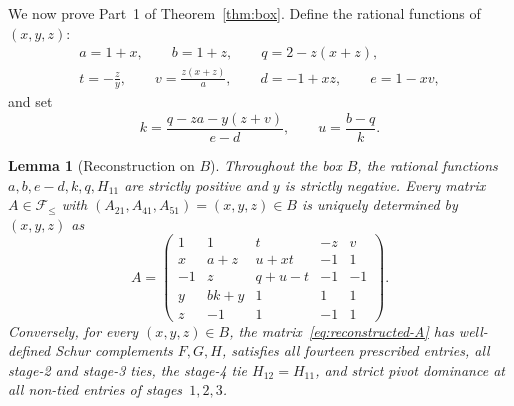 \documentclass[11pt]{article}
\newtheorem{lemma}[theorem]{Lemma}
\theoremstyle{remark}
\begin{document}
We now prove Part~1 of Theorem~\ref{thm:box}. Define the rational functions of
$(x,y,z)$:
\begin{equation}\label{eq:aux-vars}
\begin{gathered}
  a = 1+x,\qquad b = 1+z,\qquad q = 2-z(x+z),\\
  t = -\frac{z}{y},\qquad v = \frac{z(x+z)}{a},\qquad d = -1+xz,\qquad e = 1-xv,
\end{gathered}
\end{equation}
and set
\[
  k = \frac{q-za-y(z+v)}{e-d},\qquad u = \frac{b-q}{k}.
\]

\begin{lemma}[Reconstruction on $B$]\label{lem:reconstruct}
Throughout the box $B$, the rational functions $a,b,e-d,k,q,H_{11}$ are
strictly positive and $y$ is strictly negative. Every matrix
$A\in\mathcal{F}_{\le}$ with $(A_{21},A_{41},A_{51})=(x,y,z)\in B$ is uniquely
determined by $(x,y,z)$ as
\begin{equation}\label{eq:reconstructed-A}
A = \begin{pmatrix}
  1 & 1 & t & -z & v \\
  x & a+z & u+xt & -1 & 1 \\
  -1 & z & q+u-t & -1 & -1 \\
  y & bk+y & 1 & 1 & 1 \\
  z & -1 & 1 & -1 & 1
\end{pmatrix}.
\end{equation}
Conversely, for every $(x,y,z)\in B$, the matrix~\eqref{eq:reconstructed-A}
has well-defined Schur complements $F,G,H$, satisfies all fourteen prescribed
entries, all stage-2 and stage-3 ties, the stage-4 tie $H_{12}=H_{11}$, and
strict pivot dominance at all non-tied entries of stages~$1,2,3$.
\end{lemma}
\end{document}
